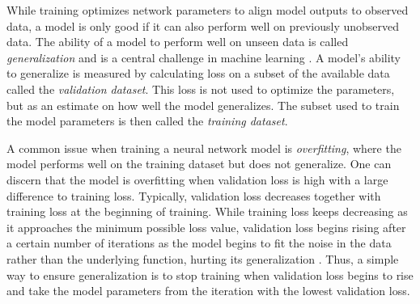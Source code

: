 While training optimizes network parameters to align model
outputs to observed data, a model is only good if it can 
also perform well on previously unobserved data. The ability of a model
to perform well on unseen data is called 
\textit{generalization} and is a central challenge in 
machine learning \Parencite[Chapter 5]{deeplearningbook}.
A model's ability to generalize is measured by
calculating loss on a subset of the available data called the 
\textit{validation dataset}. This loss
is not used to optimize the parameters, but as an estimate 
on how well the model generalizes. The subset used to train
the model parameters is then called the \textit{training dataset}. 

A common issue when training a neural network model
is \textit{overfitting}, where the model 
performs well on the training dataset but does not generalize.
One can discern that the model is overfitting when
validation loss is high with a large difference to training loss.
Typically, validation loss decreases together with training loss
at the beginning of training. While training loss keeps decreasing 
as it approaches the minimum possible loss value, validation loss
begins rising after a certain number of iterations as the model
begins to fit the noise in the data rather than the underlying 
function, hurting its generalization \parencite[Chapter 2.2]{neuronbook}. 
Thus, a simple way to ensure generalization is to stop training
when validation loss begins to rise and take the model parameters
from the iteration with the lowest validation loss.

